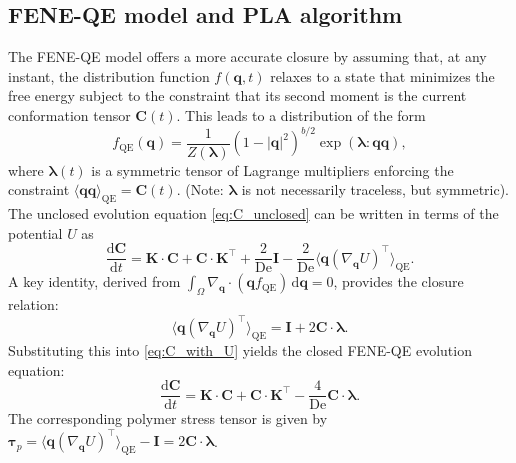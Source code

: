 \documentclass[preprint,12pt]{elsarticle}
\begin{document}
\subsection{FENE-QE model and PLA algorithm}
The FENE-QE model \cite{Ilg02} offers a more accurate closure by assuming that, at any instant, the distribution function $f(\bm{q},t)$ relaxes to a state that minimizes the free energy subject to the constraint that its second moment is the current conformation tensor $\bm{C}(t)$. This leads to a distribution of the form
\begin{equation}
    \label{eq:f_qe}
    f_{\mathrm{QE}}(\bm{q}) = \frac{1}{Z(\bm{\lambda})} (1 - |\bm{q}|^2)^{b/2} \exp\left(\bm{\lambda}: \bm{q}\bm{q} \right),
\end{equation}
where $\bm{\lambda}(t)$ is a symmetric tensor of Lagrange multipliers enforcing the constraint $\langle \bm{q}\bm{q} \rangle_{\mathrm{QE}} = \bm{C}(t)$. (Note: $\bm{\lambda}$ is not necessarily traceless, but symmetric).
The unclosed evolution equation \eqref{eq:C_unclosed} can be written in terms of the potential $U$ as
\begin{equation}
    \frac{\mathrm{d}\bm{C}}{\mathrm{d}t} = \bm{K}\cdot\bm{C} + \bm{C}\cdot\bm{K}^\top + \frac{2}{\mathrm{De}}\bm{I} - \frac{2}{\mathrm{De}} \langle \bm{q} (\nabla_{\bm{q}} U)^\top \rangle_{\mathrm{QE}}.\label{eq:C_with_U}
\end{equation}
A key identity, derived from $\int_{\Omega} \nabla_{\bm{q}} \cdot (\bm{q} f_{\mathrm{QE}}) \,\mathrm{d}\bm{q} = 0$, provides the closure relation:
\begin{equation}
    \langle \bm{q} (\nabla_{\bm{q}} U)^\top \rangle_{\mathrm{QE}} = \bm{I} + 2 \bm{C} \cdot \bm{\lambda}.
\end{equation}
Substituting this into \eqref{eq:C_with_U} yields the closed FENE-QE evolution equation:
\begin{equation}
    \frac{\mathrm{d}\bm{C}}{\mathrm{d}t} = \bm{K}\cdot\bm{C} + \bm{C}\cdot\bm{K}^\top - \frac{4}{\mathrm{De}} \bm{C} \cdot \bm{\lambda}.\label{eq:feneqe}
\end{equation}
The corresponding polymer stress tensor is given by $\bm{\tau}_p = \langle \bm{q} (\nabla_{\bm{q}} U)^\top \rangle_{\mathrm{QE}} - \bm{I} = 2\bm{C} \cdot \bm{\lambda}$.
\end{document}
